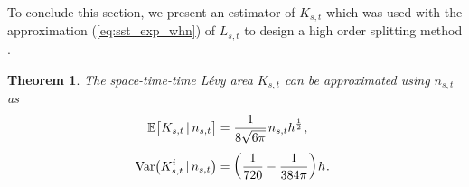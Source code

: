 \documentclass[sn-mathphys-num]{sn-jnl}%
\newtheorem{theorem}{Theorem}%
\newcommand{\E}{\mathbb{E}}
\newcommand{\m}{\hspace{0.25mm}}
\newcommand{\var}{\mathrm{Var}}
\begin{document}
To conclude this section, we present an estimator of $K_{s,t}$ which was used with the approximation (\ref{eq:sst_exp_whn}) of $L_{s,t}$ to design a high order splitting method \cite[Example 4.7]{foster2024splitting}.\medbreak
\begin{theorem}\label{thm:new_stt_estimator}
The space-time-time L\'{e}vy area $K_{s,t}$ can be approximated using $n_{s,t}$ as
\begin{align}
\E\big[K_{s,t} \,|\, n_{s,t}\big] & = \frac{1}{8\sqrt{6\pi}}\m n_{s,t} h^{\frac{1}{2}}\m,\hspace{1.25mm}\label{eq:K_mean}\\[3pt]
\var\big(K_{s,t}^i \,|\, n_{s,t}\big) & = \bigg(\frac{1}{720} - \frac{1}{384\pi}\bigg)\m h\m.\hspace{1.25mm}\label{eq:K_second_moment}
\end{align}
\end{theorem}
\end{document}
